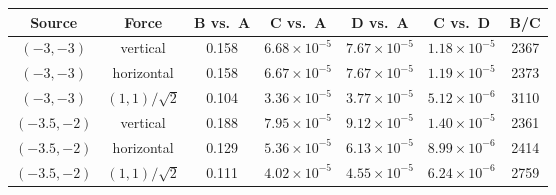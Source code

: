 \begin{tabular}{ccccccc}
\toprule
Source & Force & B vs.\ A & C vs.\ A & D vs.\ A & C vs.\ D & B/C \\
\midrule
$(-3,-3)$ & vertical & 0.158 & $6.68\times 10^{-5}$ & $7.67\times 10^{-5}$ & $1.18\times 10^{-5}$ & 2367 \\
$(-3,-3)$ & horizontal & 0.158 & $6.67\times 10^{-5}$ & $7.67\times 10^{-5}$ & $1.19\times 10^{-5}$ & 2373 \\
$(-3,-3)$ & $(1,1)/\sqrt{2}$ & 0.104 & $3.36\times 10^{-5}$ & $3.77\times 10^{-5}$ & $5.12\times 10^{-6}$ & 3110 \\
$(-3.5,-2)$ & vertical & 0.188 & $7.95\times 10^{-5}$ & $9.12\times 10^{-5}$ & $1.40\times 10^{-5}$ & 2361 \\
$(-3.5,-2)$ & horizontal & 0.129 & $5.36\times 10^{-5}$ & $6.13\times 10^{-5}$ & $8.99\times 10^{-6}$ & 2414 \\
$(-3.5,-2)$ & $(1,1)/\sqrt{2}$ & 0.111 & $4.02\times 10^{-5}$ & $4.55\times 10^{-5}$ & $6.24\times 10^{-6}$ & 2759 \\
\bottomrule
\end{tabular}
